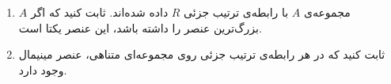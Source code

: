 \EXERCISE
\begin{enumerate}
\item
مجموعه‌ی
$A$
با رابطه‌ی ترتیب جزئی
$R$
داده شده‌اند. ثابت کنید که اگر
$A$
بزرگ‌ترین عنصر را داشته باشد، این عنصر یکتا است.
\item
ثابت کنید که در هر رابطه‌ی ترتیب جزئی روی مجموعه‌ای متناهی، عنصر مینیمال وجود دارد.
\end{enumerate}